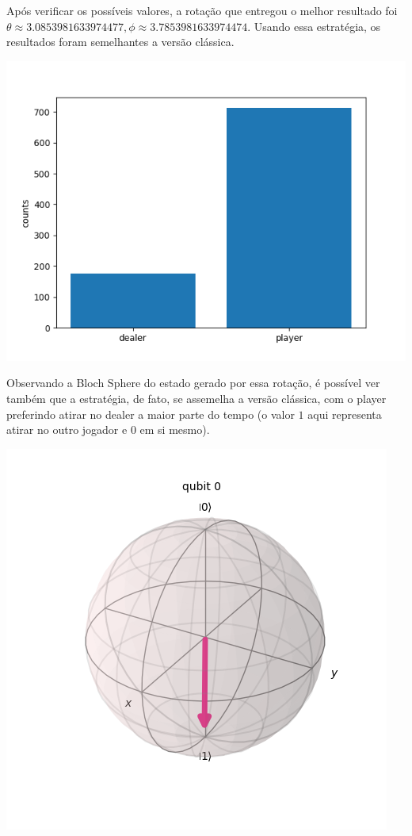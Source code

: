 \documentclass{article}
\begin{document}
Após verificar os possíveis valores, a rotação que entregou o melhor resultado foi $\theta\approx 3.0853981633974477, \phi\approx3.7853981633974474$. Usando essa estratégia, os resultados foram semelhantes a versão clássica.

\begin{center}
	\includegraphics[scale=0.6]{final_buckshot_roulette_quantum_optimal_strategy.png}
	\label{fig:bckr-circuit-result}
\end{center}

Observando a Bloch Sphere do estado gerado por essa rotação, é possível ver também que a estratégia, de fato, se assemelha a versão clássica, com o player preferindo atirar no dealer a maior parte do tempo (o valor $1$ aqui representa atirar no outro jogador e $0$ em si mesmo).

\begin{center}
	\includegraphics[scale=0.6]{player_optimal_strategy_bloch.png}
	\label{fig:bckr-bloch-sphere-best-strategy}
\end{center}
\end{document}
